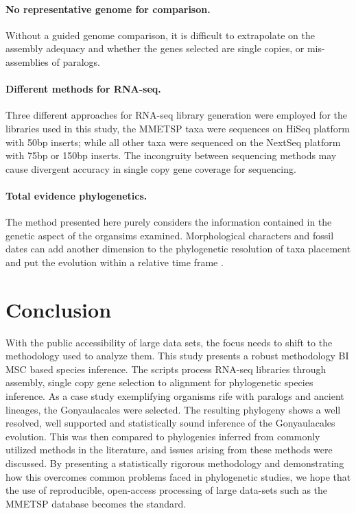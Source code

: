 \documentclass[12pt]{article}
\begin{document}
\paragraph*{No representative genome for comparison.} 
Without a guided genome comparison, it is difficult to extrapolate on the assembly adequacy and whether the genes selected are single copies, or mis-assemblies of paralogs.
\paragraph*{Different methods for RNA-seq.} 
Three different approaches for RNA-seq library generation were employed for the libraries used in this study, the MMETSP taxa were sequences on HiSeq platform with 50bp inserts; while all other taxa were sequenced on the NextSeq platform with 75bp or 150bp inserts. 
The incongruity between sequencing methods may cause divergent accuracy in single copy gene coverage for sequencing.  
\paragraph*{Total evidence phylogenetics.}
The method presented here purely considers the information contained in the genetic aspect of the organsims examined. 
Morphological characters and fossil dates can add another dimension to the phylogenetic resolution of taxa placement and put the evolution within a relative time frame \cite{gavryushkina2017bayesian}.  

\newpage
\section{Conclusion}
With the public accessibility of large data sets, the focus needs to shift to the methodology used to analyze them. 
This study presents a robust methodology BI MSC based species inference. 
The scripts process RNA-seq libraries through assembly, single copy gene selection to alignment for phylogenetic species inference. 
As a case study exemplifying organisms rife with paralogs and ancient lineages, the Gonyaulacales were selected. 
The resulting phylogeny shows a well resolved, well supported and statistically sound inference of the Gonyaulacales evolution. 
This was then compared to phylogenies inferred from commonly utilized methods in the literature, and issues arising from these methods were discussed. 
By presenting a statistically rigorous methodology and demonstrating how this overcomes common problems faced in phylogenetic studies, we hope that the use of reproducible, open-access processing of large data-sets such as the MMETSP database becomes the standard.  
\newpage
\end{document}

